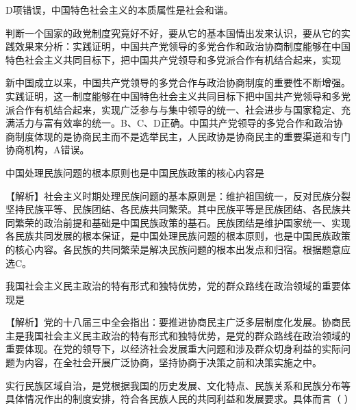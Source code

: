 \begin{solution}D项错误，中国特色社会主义的本质属性是社会和谐。
\end{solution}
\question 判断一个国家的政党制度究竟好不好，要从它的基本国情出发来认识，要从它的实践效果来分析：实践证明，中国共产党领导的多党合作和政治协商制度能够在中国特色社会主义共同目标下，把中国共产党领导和多党派合作有机结合起来，实现
\par{}
\begin{solution}新中国成立以来，中国共产党领导的多党合作与政治协商制度的重要性不断增强。实践证明，这一制度能够在中国特色社会主义共同目标下把中国共产党领导和多党派合作有机结合起来，实现广泛参与与集中领导的统一、社会进步与国家稳定、充满活力与富有效率的统一。B、C、D正确。中国共产党领导的多党合作和政治协商制度体现的是协商民主而不是选举民主，人民政协是协商民主的重要渠道和专门协商机构，A错误。
\end{solution}
\question 中国处理民族问题的根本原则也是中国民族政策的核心内容是
\par{}
\begin{solution}【解析】社会主义时期处理民族问题的基本原则是：维护祖国统一，反对民族分裂坚持民族平等、民族团结、各民族共同繁荣。其中民族平等是民族团结、各民族共同繁荣的政治前提和基础是中国民族政策的基石。民族团结是维护国家统一、实现各民族共同发展的根本保证，是中国处理民族问题的根本原则，也是中国民族政策的核心内容。各民族的共同繁荣是解决民族问题的根本出发点和归宿。根据题意应选C。
\end{solution}
\question 我国社会主义民主政治的特有形式和独特优势，党的群众路线在政治领域的重要体现是
\par{}
\begin{solution}【解析】党的十八届三中全会指出：要推进协商民主广泛多层制度化发展。协商民主是我国社会主义民主政治的特有形式和独特优势，是党的群众路线在政治领域的重要体现。在党的领导下，以经济社会发展重大问题和涉及群众切身利益的实际问题为内容，在全社会开展广泛协商，坚持协商于决策之前和决策实施之中。
\end{solution}
\question 实行民族区域自治，是党根据我国的历史发展、文化特点、民族关系和民族分布等具体情况作出的制度安排，符合各民族人民的共同利益和发展要求。具体而言（
）
\par{}
